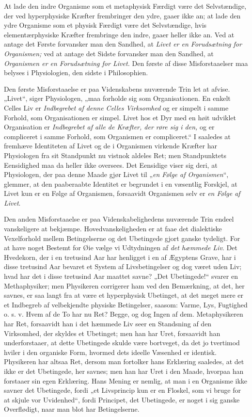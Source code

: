 \documentclass[12pt,a4paper]{book}
\begin{document}
At lade den indre Organisme som et metaphysisk Færdigt være det
Selvstændige, der ved hyperphysiske Kræfter frembringer den ydre, gaaer
ikke an; at lade den ydre Organisme som et physisk Færdigt være det
Selvstændige, hvis elementærphysiske Kræfter frembringe den indre, gaaer
heller ikke an. Ved at antage det Første forvansker man den Sandhed, at
\emph{Livet er en Forudsætning for Organismen;} ved at antage det Sidste
forvansker man den Sandhed, at \emph{Organismen er en Forudsætning for
Livet.} Den første af disse Misforstaaelser maa belyses i Physiologien,
den sidste i Philosophien.

Den første Misforstaaelse er paa Videnskabens nuværende Trin let at
afvise. „Livet“, siger Physiologen, „maa forholde sig som
Organisationen. En enkelt Celles Liv er \emph{Indbegrebet af denne
Celles Virksomhed} og er simpelt i samme Forhold, som Organisationen er
simpel. Livet hos et Dyr med en høit udviklet Organisation er
\emph{Indbegrebet af alle de Kræfter, der røre sig i den,} og er compliceret i
samme Forhold, som Organismen er compliceret.“ I saaledes at fremhæve
Identiteten af Livet og de i Organismen virkende Kræfter har
Physiologen fra sit Standpunkt nu vistnok aldeles Ret; men Standpunktets
Eensidighed maa da heller ikke oversees. Det Eensidige viser sig deri,
at Physiologen, der paa denne Maade gjør Livet til „\emph{en Følge af
Organismen}“, glemmer, at den paaberaabte Identitet er begrundet i en
væsentlig Forskjel, at Livet kun er en Følge af Organismen, forsaavidt
Organismen selv er \emph{en Følge af Livet}.

Den anden Misforstaaelse er paa Videnskabelighedens nuværende Trin
endeel vanskeligere at bekjæmpe. Hovedvanskeligheden er at faae det
dialektiske Vexelforhold mellem Betingelserne og det Ubetingede gjort
ganske tydeligt. For at have noget Bestemt for Øie vælge vi Udtydningen
af \emph{det hæmmede Liv}. Det Hvedekorn, der i en tretusind Aar har henligget
i en af Ægyptens Grave, har i disse tretusind Aar bevaret et System af
Livsbetingelser og dog været uden Liv; hvad har det i disse tretusind
Aar maattet savne? „Det Ubetingede!“ svarer en Methaphysiker; men
Physikeren corrigerer ham ved den Bemærkning, at det, her savnes, er saa
langt fra at være et hyperphysisk Ubetinget,
at det meget mere er et Indbegreb af velbekjendte physiske Betingelser,
saasom: Varme, Lys, Fugtighed o. s. v. Hvem af de To har nu Ret? Begge,
og dog Ingen af dem. Metaphysikeren har Ret, forsaavidt han i det
hæmmede Liv seer en Standsning af den Virksomhed, der skyldes et
Ubetinget; men han har Uret, forsaavidt han underforstaaer, at dette
Ubetingede skulde være bortveget, da det jo tvertimod hviler i den
organiske Form, hvormed dets ideelle Væsenhed er identisk. Physikeren
har altsaa Ret, dersom man fortolker hans Erklæring saaledes, at det
ikke er det Ubetingede, her savnes; men han har Uret i den Maade,
hvorpaa han forstaaer sin egen Erklæring. Hans Mening er nemlig, at man
i en Organisme ikke savner det Ubetingede, fordi „et Livsprincip kun er
en Floskel, som vi bruge for at skjule vor Uvidenhed“, fordi Principet,
det Ubetingede, er noget i sig ganske Overflødigt, naar man blot har
Betingelserne.
\end{document}

